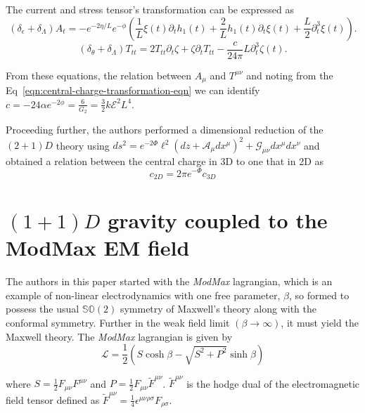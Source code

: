The current and stress tensor's transformation can be expressed as 
\begin{equation}
    (\delta_{\epsilon} + \delta_{\Lambda}) A_t = -e^{-2\eta/L}e^{-\phi}\left(\frac{1}{L}\xi(t)\partial_th_1(t) + \frac{2}{L}h_1(t)\partial_t\xi(t) + \frac{L}{2}\partial_t^3\xi(t)\right).
\end{equation}
\begin{equation}
    (\delta_{\theta} + \delta_{\Lambda})T_{tt} = 2T_{tt}\partial_t\zeta + \zeta\partial_tT_{tt} - \frac{c}{24\pi}L\partial_t^3\zeta(t).
\end{equation}

From these equations, the relation between $A_{\mu}$ and $T^{\mu\nu}$ and noting from the Eq~\ref{eqn:central-charge-transformation-eqn} we can identify $c=-24\alpha e^{-2\phi}=\displaystyle\frac{6}{G_2}=\displaystyle\frac{3}{2}k\mathcal{E}^2 L^4$.

Proceeding further, the authors performed a dimensional reduction of the $(2+1)D$ theory using $ds^2 = e^{-2\Phi}\ell^2(dz + \mathcal{A}_\mu dx^\mu)^2 + \mathcal{G}_{\mu\nu}dx^\mu dx^\nu$ and obtained a relation between the central charge in 3D to one that in 2D as 
\begin{equation}
    c_{2D} = 2\pi e^{-\Phi}c_{3D}
\end{equation}

\section{$(1+1)D$ gravity coupled to the ModMax EM field \cite{rathi2023ads2} \cite{born1934foundations}}
\label{drc-hemant-paper}

The authors in this paper started with the \textit{ModMax} lagrangian, which is an example of non-linear electrodynamics with one free parameter, $\beta$, so formed to possess the usual $\mathbb{SO}(2)$ symmetry of Maxwell's theory along with the conformal symmetry. Further in the weak field limit $\left( \beta \to \infty \right) $, it must yield the Maxwell theory. The \textit{ModMax} lagrangian is given by
\begin{equation}
    \label{eqn:modmax-lagrangian}
    \mathcal{L} = \frac{1}{2} \left( S \cosh\beta - \sqrt{S^2+P^2}\sinh\beta  \right)
\end{equation}

where $S=\frac{1}{2}F_{\mu\nu}F^{\mu\nu}$ and $P=\frac{1}{2}F_{\mu\nu}\tilde{F}^{\mu\nu}$. $\tilde{F}^{\mu\nu}$ is the hodge dual of the electromagnetic field tensor defined as $\tilde{F}^{\mu\nu} = \frac{1}{4}\epsilon^{\mu\nu\rho\sigma}F_{\rho\sigma}$.


